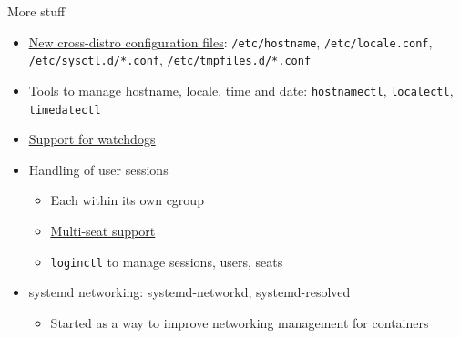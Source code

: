 \documentclass[11pt,final,usepdftitle=false]{beamer}
\begin{document}
\begin{frame}{More stuff}
	\begin{itemize}
		\item \href{http://0pointer.net/blog/projects/the-new-configuration-files.html}{\ul{New cross-distro configuration files}}: \texttt{/etc/hostname}, \texttt{/etc/locale.conf}, \texttt{/etc/sysctl.d/*.conf}, \texttt{/etc/tmpfiles.d/*.conf}
			\hbr
		\item \href{http://www.certdepot.net/rhel7-get-started-systemd/}{\ul{Tools to manage hostname, locale, time and date}}: \texttt{hostnamectl}, \texttt{localectl}, \texttt{timedatectl}
			\hbr
		\item \href{http://0pointer.net/blog/projects/watchdog.html}{\ul{Support for watchdogs}}
			\hbr
		\item Handling of user sessions
			\begin{itemize}
				\item Each within its own cgroup
					\hbr
				\item \href{http://0pointer.net/blog/projects/multi-seat.html}{\ul{Multi-seat support}}
					\hbr
				\item \texttt{loginctl} to manage sessions, users, seats
			\end{itemize}
			\hbr
		\item systemd networking: systemd-networkd, systemd-resolved
			\begin{itemize}
				\item Started as a way to improve networking management for containers
			\end{itemize}
	\end{itemize}
\end{frame}
\end{document}

